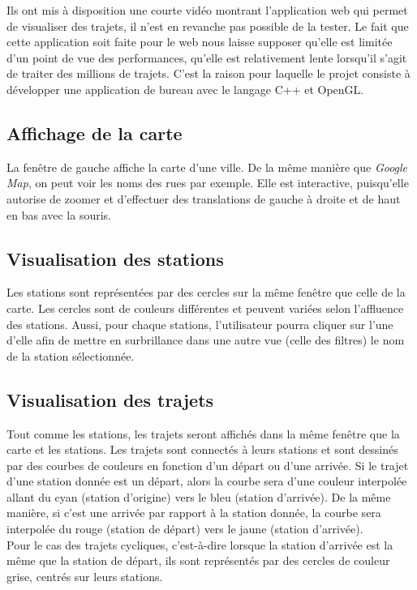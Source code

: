 \documentclass[12pt]{article}
\begin{document}
	Ils ont mis à disposition une courte vidéo montrant l'application web qui permet 
	de visualiser des trajets, il n'est en revanche pas possible de la tester. Le fait
	que cette application
	soit faite pour le web nous laisse	supposer qu’elle est limitée d'un
	point de vue des performances, qu’elle est relativement lente lorsqu’il s’agit
	de traiter des millions de trajets. C’est la raison pour laquelle 
	le projet consiste à développer une application de bureau avec le langage C++ et OpenGL.
	
		\subsection{Affichage de la carte} \label{interactions_et_affichages}
		La fenêtre de gauche affiche la carte d'une ville. De la même manière que
		\textit{Google Map}, on peut voir les noms des rues par exemple. Elle est interactive,
		puisqu'elle autorise de zoomer et d'effectuer des translations de gauche à droite et 
		de haut en bas avec la souris.
		
		\subsection{Visualisation des stations}
		Les stations sont représentées par des cercles sur la même fenêtre que celle de la carte.
		Les cercles sont de couleurs différentes et peuvent variées selon l'affluence des stations.
		Aussi, pour chaque stations, l'utilisateur pourra cliquer sur l'une d'elle afin de mettre
		en surbrillance dans une autre vue (celle des filtres) le nom de la station sélectionnée.
		
		\subsection{Visualisation des trajets}
		Tout comme les stations, les trajets seront affichés dans la même fenêtre que la carte et
		les stations. Les trajets sont connectés à leurs stations et sont dessinés par des courbes
		de couleurs en fonction d'un départ ou d'une arrivée. Si le trajet d'une station donnée est
		un départ, alors la courbe sera d'une couleur interpolée allant du cyan (station d'origine)
		vers le bleu (station d'arrivée). De la même manière, si c'est une arrivée par rapport à la
		station donnée, la courbe sera interpolée du rouge (station de départ) vers le jaune
		(station d'arrivée).\\
		Pour le cas des trajets cycliques, c'est-à-dire lorsque la station d'arrivée est la même que la station de départ, ils sont représentés
		par des cercles de couleur grise, centrés sur leurs stations.
	
\end{document}
